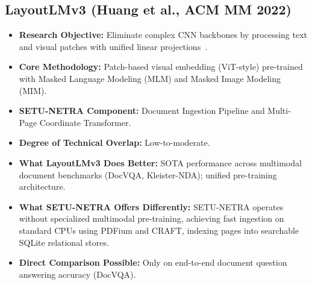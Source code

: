 \documentclass[11pt,a4paper]{article}
\begin{document}
\subsection{LayoutLMv3 (Huang et al., ACM MM 2022)}
\begin{itemize}[leftmargin=*]
    \item \textbf{Research Objective:} Eliminate complex CNN backbones by processing text and visual patches with unified linear projections~\cite{Huang2022LayoutLMv3}.
    \item \textbf{Core Methodology:} Patch-based visual embedding (ViT-style) pre-trained with Masked Language Modeling (MLM) and Masked Image Modeling (MIM).
    \item \textbf{SETU-NETRA Component:} Document Ingestion Pipeline and Multi-Page Coordinate Transformer.
    \item \textbf{Degree of Technical Overlap:} Low-to-moderate.
    \item \textbf{What LayoutLMv3 Does Better:} SOTA performance across multimodal document benchmarks (DocVQA, Kleister-NDA); unified pre-training architecture.
    \item \textbf{What SETU-NETRA Offers Differently:} SETU-NETRA operates without specialized multimodal pre-training, achieving fast ingestion on standard CPUs using PDFium and CRAFT, indexing pages into searchable SQLite relational stores.
    \item \textbf{Direct Comparison Possible:} Only on end-to-end document question answering accuracy (DocVQA).
\end{itemize}

\end{document}
